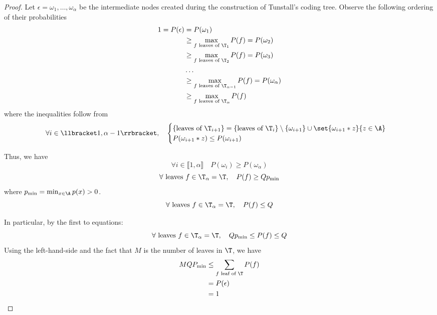 \documentclass[toc, titlepaged]{../cs-classes/cs-classes}
\begin{document}
\begin{proof}
    Let $\epsilon=\omega_1, \dots, \omega_\alpha$ be the intermediate nodes created during the construction of Tunstall's coding tree. Observe the following ordering of their probabilities
    \begin{equation*}
        \begin{aligned}
            1 = P(\epsilon) &= P(\omega_1)\\
            &\geq \max_{f\textnormal{ leaves of }\T_1}P(f) = P(\omega_2)\\
            &\geq \max_{f\textnormal{ leaves of }\T_2}P(f) = P(\omega_3)\\
            &\dots\\
            &\geq \max_{f\textnormal{ leaves of }\T_{\alpha-1}}P(f) = P(\omega_\alpha)\\
            &\geq \max_{f\textnormal{ leaves of }\T_\alpha}P(f)
        \end{aligned}
    \end{equation*}
    where the inequalities follow from
    \begin{equation*}
        \forall i\in\llbracket1, \alpha-1\rrbracket, \quad \begin{cases}
            \{\textnormal{leaves of }\T_{i+1}\} = \{\textnormal{leaves of }\T_i\} \setminus\{\omega_{i+1}\}\cup\set{\omega_{i+1}*z}{z\in\A}\\
            P(\omega_{i+1}*z)\leq P(\omega_{i+1})
        \end{cases}
    \end{equation*}

    Thus, we have
    \begin{equation*}
        \forall i\in\llbracket1, \alpha\rrbracket \quad P(\omega_i)\geq P(\omega_\alpha)
    \end{equation*}
    \begin{equation*}
        \forall \textnormal{ leaves } f\in\T_\alpha = \T, \quad P(f)\geq Qp_{\min}
    \end{equation*}
    where $p_{\min} = \min_{x\in\A}p(x)>0$.
    \begin{equation*}
        \forall \textnormal{ leaves } f\in\T_\alpha = \T, \quad P(f)\leq Q
    \end{equation*}

    In particular, by the first to equations:
    \begin{equation*}
        \forall \textnormal{ leaves } f\in\T_\alpha = \T, \quad Qp_{\min} \leq P(f) \leq Q
    \end{equation*}
    Using the left-hand-side and the fact that $M$ is the number of leaves in $\T$, we have
    \begin{equation*}
        \begin{aligned}
            MQP_{\min} &\leq \sum_{f \textnormal{ leaf of }\T} P(f)\\
            &= P(\epsilon)\\
            &= 1
        \end{aligned}
    \end{equation*}


\end{proof}
\end{document}
